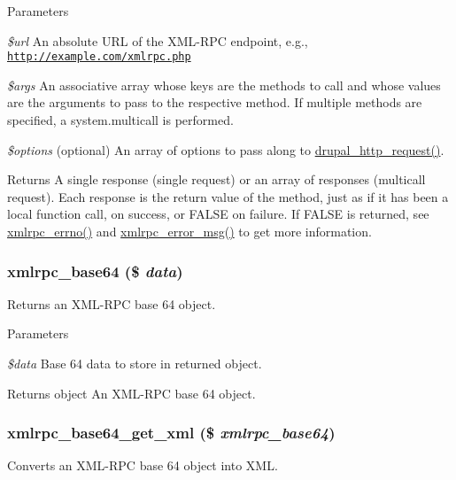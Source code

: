 \begin{DoxyParams}{Parameters}
\item[{\em \$url}]An absolute URL of the XML-\/RPC endpoint, e.g., \href{http://example.com/xmlrpc.php}{\tt http://example.com/xmlrpc.php} \item[{\em \$args}]An associative array whose keys are the methods to call and whose values are the arguments to pass to the respective method. If multiple methods are specified, a system.multicall is performed. \item[{\em \$options}](optional) An array of options to pass along to \hyperlink{group__http__handling_gaad3affacd718b960300dcdddefa518aa}{drupal\_\-http\_\-request()}.\end{DoxyParams}
\begin{DoxyReturn}{Returns}
A single response (single request) or an array of responses (multicall request). Each response is the return value of the method, just as if it has been a local function call, on success, or FALSE on failure. If FALSE is returned, see \hyperlink{xmlrpc_8inc_af9d29505279c00e66545f3859550ff88}{xmlrpc\_\-errno()} and \hyperlink{xmlrpc_8inc_abaf990108687e6e764164984306dbd55}{xmlrpc\_\-error\_\-msg()} to get more information. 
\end{DoxyReturn}
\hypertarget{xmlrpc_8inc_a0a49b5ffbb4c8e76bc96c2bc7b8d22dc}{
\subsubsection[{xmlrpc\_\-base64}]{\setlength{\rightskip}{0pt plus 5cm}xmlrpc\_\-base64 (\$ {\em data})}}
\label{xmlrpc_8inc_a0a49b5ffbb4c8e76bc96c2bc7b8d22dc}
Returns an XML-\/RPC base 64 object.


\begin{DoxyParams}{Parameters}
\item[{\em \$data}]Base 64 data to store in returned object.\end{DoxyParams}
\begin{DoxyReturn}{Returns}
object An XML-\/RPC base 64 object. 
\end{DoxyReturn}
\hypertarget{xmlrpc_8inc_ad45673fd18d893a23b7b77d0c67f7b4a}{
\subsubsection[{xmlrpc\_\-base64\_\-get\_\-xml}]{\setlength{\rightskip}{0pt plus 5cm}xmlrpc\_\-base64\_\-get\_\-xml (\$ {\em xmlrpc\_\-base64})}}
\label{xmlrpc_8inc_ad45673fd18d893a23b7b77d0c67f7b4a}
Converts an XML-\/RPC base 64 object into XML.



